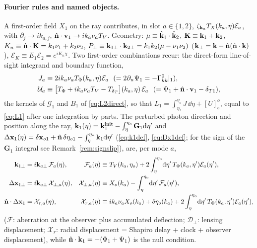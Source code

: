 \paragraph{Fourier rules and named objects.}  A first-order field $X_1$ on the ray contributes, in slot $a\in\{1,2\}$,
$\zeta_{\mathbf k_a}T_X(k_a,\eta)\mathcal E_a$, with $\partial_j\to ik_{a,j}$, $\hat{\mathbf n}\cdot\mathbf v_1\to ik_a\nu_aT_V$.  Geometry:
$\mu\equiv\hat{\mathbf k}_1\cdot\hat{\mathbf k}_2$, $\mathbf K\equiv\mathbf k_1+\mathbf k_2$, $K_n\equiv\hat{\mathbf n}\cdot\mathbf K=k_1\nu_1+k_2\nu_2$,
$P_\perp\equiv\mathbf k_{1\perp}\cdot\mathbf k_{2\perp}=k_1k_2(\mu-\nu_1\nu_2)$ ($\mathbf k_\perp=\mathbf k-\hat{\mathbf n}(\hat{\mathbf n}\cdot\mathbf k)$), $\mathcal E_K\equiv E_1\mathcal E_2=e^{iK_n\chi}$.
Two first-order combinations recur: the direct-form line-of-sight integrand and boundary function,
\begin{align}
J_a&\equiv2ik_a\nu_a\TP(k_a,\eta)\mathcal E_a\ \ (=2\partial_n\Psi_1=-\Gamma^0_{kk}|_1),\nonumber\\
\mathcal U_a&\equiv\big[\TP+ik_a\nu_aT_V-T_{\delta_T}\big](k_a,\eta)\,\mathcal E_a\ \ (=\Psi_1+\nhat\cdot\vv_1-\delta_{T1}),
\label{eq:asm-JU}
\end{align}
the kernels of $\mathcal G_1$ and $B_1$ of \eqref{eq:L2direct}, so that $L_1=\int_{\eta_*}^{\eta_o}J\,\dd\eta+[U]^{o}_{e}$, equal to \eqref{eq:L1}
after one integration by parts.  The perturbed photon
direction and position along the ray, $\mathbf k_1(\eta)=\mathbf k_{1}^{\rm init}-\int_\eta^{\eta_o}\mathbf G_1\mathrm d\eta'$ and
$\Delta\mathbf x_1(\eta)=\delta\mathbf x_{o1}+\hat{\mathbf n}\,\delta\eta_{o1}-\int_\eta^{\eta_o}\mathbf k_1\mathrm d\eta'$ (\eqref{eq:k1def}, \eqref{eq:Dx1def}; for the sign of the $\mathbf G_1$ integral see Remark~\ref{rem:signslip}), are, per mode $a$,
\begin{align}
\mathbf k_{1\perp}&=i\mathbf k_{a\perp}\,\mathcal F_a(\eta), &
\mathcal F_a(\eta)&\equiv T_V(k_a,\eta_o)+2\int_\eta^{\eta_o}\!\mathrm d\eta'\,T_\Phi(k_a,\eta')\mathcal E_a(\eta'),\nonumber\\
\Delta\mathbf x_{1\perp}&=i\mathbf k_{a\perp}\,\mathcal X_{\perp,a}(\eta), &
\mathcal X_{\perp,a}(\eta)&\equiv X_o(k_a)-\int_\eta^{\eta_o}\!\mathrm d\eta'\,\mathcal F_a(\eta'),\nonumber\\
\hat{\mathbf n}\cdot\Delta\mathbf x_1&=\mathcal X_{r,a}(\eta), &
\mathcal X_{r,a}(\eta)&\equiv ik_a\nu_aX_o(k_a)+\delta\eta_o(k_a)+2\int_\eta^{\eta_o}\!\mathrm d\eta'\,T_\Phi(k_a,\eta')\mathcal E_a(\eta'),
\label{eq:asm-functionals}
\end{align}
($\mathcal F$: aberration at the observer plus accumulated deflection; $\mathcal D_\perp$: lensing displacement; $\mathcal X_r$: radial
displacement = Shapiro delay + clock + observer displacement), while $\hat{\mathbf n}\cdot\mathbf k_1=-(\Phi_1+\Psi_1)$ is the null condition.
